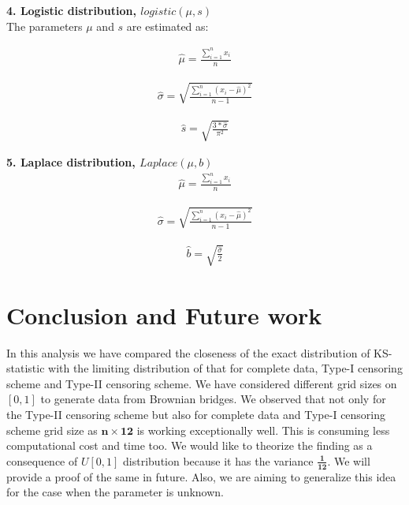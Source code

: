 \documentclass[12pt, reqno]{amsart}
\begin{document}
\textbf{4. Logistic distribution, $logistic(\mu,s)$}\\

The parameters $\mu$ and $s$ are estimated as:

\begin{align}
     \hat{ \mu} =\frac{\displaystyle\sum_{i=1}^{n} x_i}{n} 
 \end{align}

\begin{align}
     \hat{ \sigma}= \sqrt{ \frac{ \sum_{i=1}^n (x_i-\hat{\mu})^2 }{n-1}}
\end{align}

\begin{align}
    \hat{s}= \sqrt{\frac{3*\hat\sigma}{\pi^2}}
\end{align}

\newpage
\textbf{5. Laplace distribution, $Laplace(\mu,b)$}\\

\begin{align}
     \hat{ \mu} =\frac{\displaystyle\sum_{i=1}^{n} x_i}{n} 
 \end{align}

\begin{align}
     \hat{ \sigma}= \sqrt{ \frac{ \sum_{i=1}^n (x_i-\hat{\mu})^2 }{n-1}}
\end{align}

\begin{align}
    \hat{b}= \sqrt{\frac{\hat\sigma}{2}}
\end{align}


\newpage

\section{Conclusion and Future work}
In this analysis we have compared the closeness of the exact distribution of KS-statistic with the limiting distribution of that for complete data, Type-I censoring scheme and  Type-II censoring scheme. We have considered different grid sizes on $[0,1]$ to generate data from Brownian bridges. 
We observed that not only for the Type-II censoring scheme but also for complete data and Type-I censoring scheme grid size as $\mathbf{n \times 12}$ is working exceptionally well. This is consuming less computational cost and time too.
 We would like to theorize  the finding as a consequence of $U[0,1]$ distribution because it has the variance  $\mathbf{\frac{1}{12}}$. We will provide  a proof of the same in future. Also, we are aiming  to generalize this idea for the case when the  parameter is unknown.  
\end{document}
